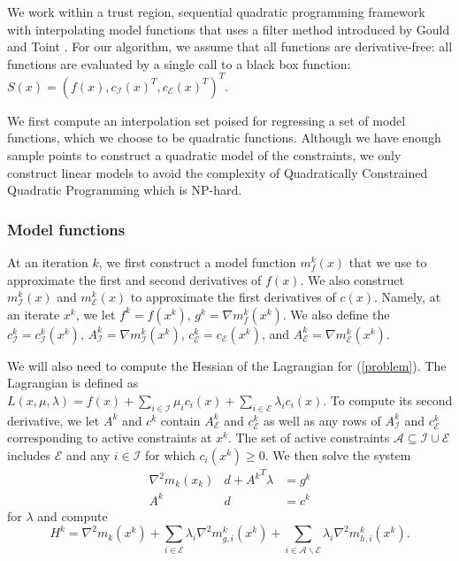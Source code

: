 \documentclass{article}
\let\oldref\ref
\renewcommand{\ref}[1]{(\oldref{#1})}
\begin{document}
We work within a trust region, sequential quadratic programming framework with interpolating model functions that uses a filter method introduced by Gould and Toint \cite{original_filter}.
For our algorithm, we assume that all functions are derivative-free: all functions are evaluated by a single call to a black box function:
$S(x) = (f(x), c_{\mathcal {I}}(x)^T, c_{\mathcal {E}}(x)^T)^T$.

We first compute an interpolation set poised for regressing a set of model functions, which we choose to be quadratic functions.
Although we have enough sample points to construct a quadratic model of the constraints, we only construct linear models to avoid the complexity of Quadratically Constrained Quadratic Programming which is NP-hard.

\subsubsection{Model functions}

At an iteration $k$, we first construct a model function $m_f^k(x)$ that we use to approximate the first and second derivatives of $f(x)$.
We also construct $m_{\mathcal{I}}^k(x)$ and $m_{\mathcal{E}}^k(x)$ to approximate the first derivatives of $c(x)$.
Namely, at an iterate $x^k$, we let $f^k = f(x^k)$, $g^k = \nabla m_f^k(x^k)$. %
We also define the $c_{{\mathcal{I}}}^k = c^k_{\mathcal{I}}(x^k)$, 
$A_{{\mathcal{I}}}^k = \nabla m_{\mathcal{I}}^k(x^k)$,
$c_{{\mathcal{E}}}^k = c_{\mathcal{E}}(x^k)$, and
$A_{{\mathcal{E}}}^k = \nabla m_{\mathcal{E}}^k(x^k)$.

We will also need to compute the Hessian of the Lagrangian for \ref{problem}.
The Lagrangian is defined as 
 $L(x, \mu, \lambda) =
 f(x)  
 + \sum_{i \in {\mathcal{I}}} \mu_i     c_i(x)
 + \sum_{i \in {\mathcal{E}}} \lambda_i c_i(x)$.
To compute its second derivative, we let $A^k$ and $c^k$ contain $A_{\mathcal{E}}^k$ and $c_{\mathcal{E}}^k$ as well as any rows of $A_{{\mathcal{I}}}^k$ and $c_{\mathcal{E}}^k$ corresponding
to active constraints at $x^k$.
The set of active constraints $\mathcal A \subseteq \mathcal I \cup \mathcal E$ includes $\mathcal E$ and any $i \in \mathcal I$ for which $c_i(x^k) \ge 0$.
We then solve the system
\begin{align*}
\nabla^2m_k(x_k) & d + {A^k}^T\lambda & = g^k \\
A^k              & d                & = c^k
\end{align*}
for $\lambda$ and compute
\[
H^k = \nabla^2 m_k(x^k) 
+ \sum_{i \in \mathcal E} \lambda_i \nabla^2 m_{g,i}^k(x^k) 
+ \sum_{i \in \mathcal A \backslash \mathcal E} \lambda_i \nabla^2 m_{h,i}^k(x^k).
\]
\end{document}
